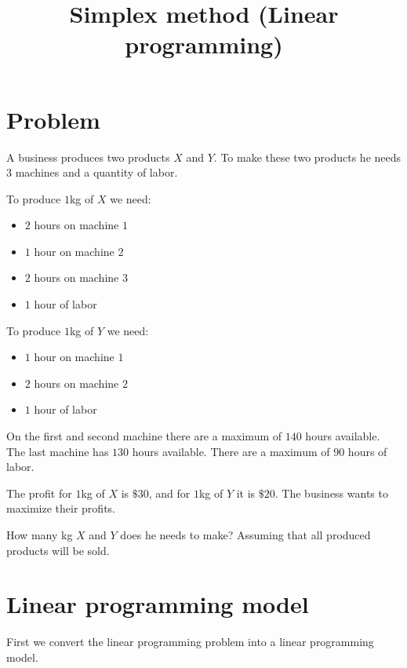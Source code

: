 \documentclass[11pt]{article}
\title{Simplex method (Linear programming)}
\providecommand{\tightlist}{%
      \setlength{\itemsep}{0pt}\setlength{\parskip}{0pt}}
\begin{document}
    
    
    \maketitle
    
    

    
    \hypertarget{problem}{%
\section{Problem}\label{problem}}

    A business produces two products \(X\) and \(Y\). To make these two
products he needs \(3\) machines and a quantity of labor.

To produce \(1\)kg of \(X\) we need:

\begin{itemize}
\tightlist
\item
  \(2\) hours on machine \(1\)
\item
  \(1\) hour on machine \(2\)
\item
  \(2\) hours on machine \(3\)
\item
  \(1\) hour of labor
\end{itemize}

To produce \(1\)kg of \(Y\) we need:

\begin{itemize}
\tightlist
\item
  \(1\) hour on machine \(1\)
\item
  \(2\) hours on machine \(2\)
\item
  \(1\) hour of labor
\end{itemize}

On the first and second machine there are a maximum of \(140\) hours
available. The last machine has \(130\) hours available. There are a
maximum of \(90\) hours of labor.

The profit for \(1\)kg of \(X\) is \(\$30\), and for \(1\)kg of \(Y\) it
is \(\$20\). The business wants to maximize their profits.

How many kg \(X\) and \(Y\) does he needs to make? Assuming that all
produced products will be sold.

    \hypertarget{linear-programming-model}{%
\section{Linear programming model}\label{linear-programming-model}}

    First we convert the linear programming problem into a linear
programming model.
\end{document}

